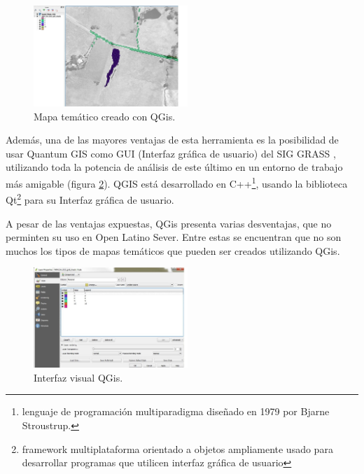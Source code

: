 \begin{figure}
\vspace{-20pt}
\begin{center}
\includegraphics[width=0.52\textwidth]{images/qGisTematic.jpg} 
\end{center} \vspace{-20pt} \caption{Mapa tem\'atico creado con QGis.}  \label{qGisTematic} \vspace{-10pt} 
\end{figure}

Adem\'as, una de las mayores ventajas de esta herramienta es la posibilidad de usar Quantum GIS como GUI (Interfaz gr\'afica de usuario) del SIG GRASS \cite{qgis}, utilizando toda la potencia de an\'alisis de este \'ultimo en un entorno de trabajo m\'as amigable (figura \ref{qGisvisual}). QGIS est\'a desarrollado en C++\footnote{lenguaje de programaci\'on multiparadigma dise\~nado en 1979 por Bjarne Stroustrup.}, usando la biblioteca Qt\footnote{framework multiplataforma orientado a objetos ampliamente usado para desarrollar programas que utilicen interfaz gr\'afica de usuario} para su Interfaz gr\'afica de usuario.

A pesar de las ventajas expuestas, QGis presenta varias desventajas, que no perminten su uso en Open Latino Sever. Entre estas se encuentran que no son muchos los tipos de mapas tem\'aticos que pueden ser creados utilizando QGis. 

\begin{figure}
\vspace{-20pt}
\begin{center}
\includegraphics[width=0.52\textwidth]{images/qGisUi.jpg} 
\end{center} \vspace{-20pt} \caption{Interfaz visual QGis.}  \label{qGisvisual} \vspace{-10pt} 
\end{figure}

